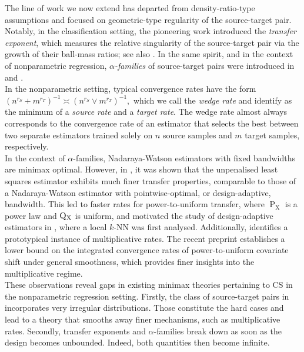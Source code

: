 \documentclass[10pt]{article}
\renewcommand{\P}{\operatorname{P}}
\newcommand{\Q}{\operatorname{Q}}
\newcommand{\sX}{\mathrm{X}}
\begin{document}
The line of work we now extend has departed from density-ratio-type assumptions and focused on geometric-type regularity of the source-target pair. Notably, in the classification setting, the pioneering work \cite{kpotufe2021marginal} introduced the \textit{transfer exponent}, which measures the relative singularity of the source-target pair via the growth of their ball-mass ratios; see also \cite{cai2024transferbandit}. In the same spirit, and in the context of nonparametric regression, \textit{$\alpha$-families} of source-target pairs were introduced in \cite{pathak2022new} and \cite{trottner2024covariate}.\\

In the nonparametric setting, typical convergence rates have the form $(n^{r_S} + m^{r_T})^{-1} \asymp (n^{r_S} \vee m^{r_T})^{-1},$ which we call the \textit{wedge rate} and identify as the minimum of a \textit{source rate} and a \textit{target rate}. The wedge rate almost always corresponds to the convergence rate of an estimator that selects the best between two separate estimators trained solely on $n$ source samples and $m$ target samples, respectively.\\

In the context of $\alpha$-families, Nadaraya-Watson estimators with fixed bandwidths are minimax optimal. However, in \cite{schmidt2022local}, it was shown that the unpenalised least squares estimator exhibits much finer transfer properties, comparable to those of a Nadaraya-Watson estimator with pointwise-optimal, or design-adaptive, bandwidth. This led to faster rates for power-to-uniform transfer, where $\P_{\sX}$ is a power law and $\Q\mathstrut_{\!\sX}$ is uniform, and motivated the study of design-adaptive estimators in \cite{zamolodtchikov2024transfer}, where a local $k$-NN was first analysed. Additionally, \cite{schmidt2022local} identifies a prototypical instance of multiplicative rates. The recent preprint \cite{zhou2025synergistic} establishes a lower bound on the integrated convergence rates of power-to-uniform covariate shift under general smoothness, which provides finer insights into the multiplicative regime.\\

These observations reveal gaps in existing minimax theories pertaining to CS in the nonparametric regression setting. Firstly, the class of source-target pairs in \cite{pathak2022new} incorporates very irregular distributions. Those constitute the hard cases and lead to a theory that smooths away finer mechanisms, such as multiplicative rates. Secondly, transfer exponents and $\alpha$-families break down as soon as the design becomes unbounded. Indeed, both quantities then become infinite. \\
\end{document}

